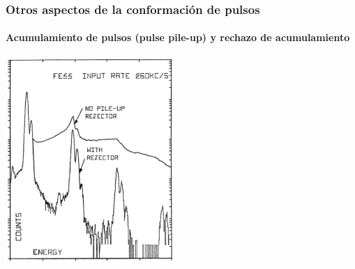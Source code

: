 \documentclass{beamer}
\begin{document}
\begin{frame}
\frametitle{Otros aspectos de la conformación de pulsos}
\framesubtitle{Acumulamiento de pulsos (pulse pile-up) y rechazo de acumulamiento} 
\begin{center}
\includegraphics[width=0.48\textwidth]{d2/pileup_rejector_graph}
\end{center}
\end{frame} 
\end{document}
